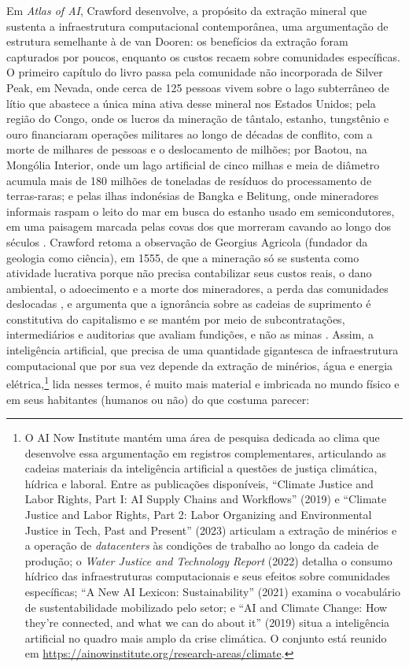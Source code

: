 Em \textit{Atlas of AI}, Crawford desenvolve, a propósito da extração mineral que sustenta a infraestrutura computacional contemporânea, uma argumentação de estrutura semelhante à de van Dooren: os benefícios da extração foram capturados por poucos, enquanto os custos recaem sobre comunidades específicas. O primeiro capítulo do livro passa pela comunidade não incorporada de Silver Peak, em Nevada, onde cerca de 125 pessoas vivem sobre o lago subterrâneo de lítio que abastece a única mina ativa desse mineral nos Estados Unidos; pela região do Congo, onde os lucros da mineração de tântalo, estanho, tungstênio e ouro financiaram operações militares ao longo de décadas de conflito, com a morte de milhares de pessoas e o deslocamento de milhões; por Baotou, na Mongólia Interior, onde um lago artificial de cinco milhas e meia de diâmetro acumula mais de 180 milhões de toneladas de resíduos do processamento de terras-raras; e pelas ilhas indonésias de Bangka e Belitung, onde mineradores informais raspam o leito do mar em busca do estanho usado em semicondutores, em uma paisagem marcada pelas covas dos que morreram cavando ao longo dos séculos \parencite[pp.~24--38]{Crawford2021Atlas}. Crawford retoma a observação de Georgius Agricola (fundador da geologia como ciência), em 1555, de que a mineração só se sustenta como atividade lucrativa porque não precisa contabilizar seus custos reais, o dano ambiental, o adoecimento e a morte dos mineradores, a perda das comunidades deslocadas \parencite[p.~27]{Crawford2021Atlas}, e argumenta que a ignorância sobre as cadeias de suprimento é constitutiva do capitalismo e se mantém por meio de subcontratações, intermediários e auditorias que avaliam fundições, e não as minas \parencite[pp.~34--36]{Crawford2021Atlas}. Assim, a inteligência artificial, que precisa de uma quantidade gigantesca de infraestrutura computacional que por sua vez depende da extração de minérios, água e energia elétrica,\footnote{O AI Now Institute mantém uma área de pesquisa dedicada ao clima que desenvolve essa argumentação em registros complementares, articulando as cadeias materiais da inteligência artificial a questões de justiça climática, hídrica e laboral. Entre as publicações disponíveis, \enquote{Climate Justice and Labor Rights, Part I: AI Supply Chains and Workflows} (2019) e \enquote{Climate Justice and Labor Rights, Part 2: Labor Organizing and Environmental Justice in Tech, Past and Present} (2023) articulam a extração de minérios e a operação de \textit{datacenters} às condições de trabalho ao longo da cadeia de produção; o \textit{Water Justice and Technology Report} (2022) detalha o consumo hídrico das infraestruturas computacionais e seus efeitos sobre comunidades específicas; \enquote{A New AI Lexicon: Sustainability} (2021) examina o vocabulário de sustentabilidade mobilizado pelo setor; e \enquote{AI and Climate Change: How they're connected, and what we can do about it} (2019) situa a inteligência artificial no quadro mais amplo da crise climática. O conjunto está reunido em \url{https://ainowinstitute.org/research-areas/climate}.} lida nesses termos, é muito mais material e imbricada no mundo físico e em seus habitantes (humanos ou não) do que costuma parecer:

